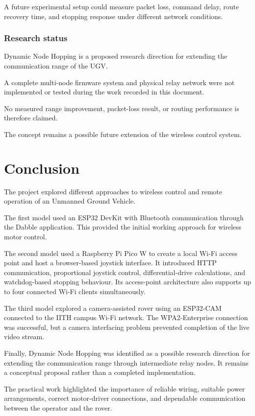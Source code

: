 \documentclass[11pt,a4paper]{article}
\begin{document}
A future experimental setup could measure packet
loss, command delay, route recovery time, and
stopping response under different network conditions.


\subsubsection{Research status}

Dynamic Node Hopping is a proposed research
direction for extending the communication range
of the UGV.

A complete multi-node firmware system and physical
relay network were not implemented or tested
during the work recorded in this document.

No measured range improvement, packet-loss result,
or routing performance is therefore claimed.

The concept remains a possible future extension
of the wireless control system.



\section{Conclusion}

The project explored different approaches to
wireless control and remote operation of an
Unmanned Ground Vehicle.

The first model used an ESP32 DevKit with Bluetooth
communication through the Dabble application.
This provided the initial working approach for
wireless motor control.

The second model used a Raspberry Pi Pico W to
create a local Wi-Fi access point and host a
browser-based joystick interface. It introduced
HTTP communication, proportional joystick control,
differential-drive calculations, and watchdog-based
stopping behaviour. Its access-point architecture
also supports up to four connected Wi-Fi clients
simultaneously.

The third model explored a camera-assisted rover
using an ESP32-CAM connected to the IITH campus
Wi-Fi network. The WPA2-Enterprise connection
was successful, but a camera interfacing problem
prevented completion of the live video stream.

Finally, Dynamic Node Hopping was identified as
a possible research direction for extending the
communication range through intermediate relay
nodes. It remains a conceptual proposal rather
than a completed implementation.

The practical work highlighted the importance
of reliable wiring, suitable power arrangements,
correct motor-driver connections, and dependable
communication between the operator and the rover.


\end{document}
